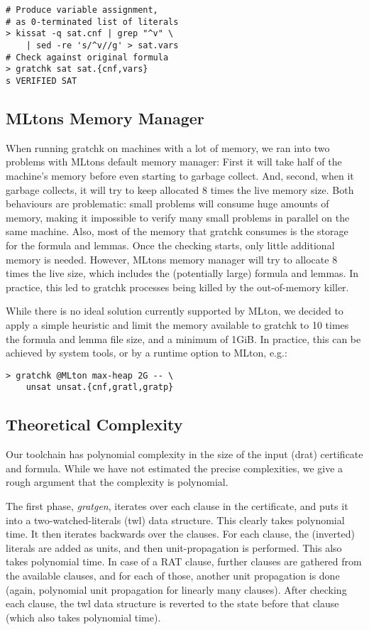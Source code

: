 \documentclass[conference]{IEEEtran}
\begin{document}
{\footnotesize
\begin{verbatim}
# Produce variable assignment,
# as 0-terminated list of literals
> kissat -q sat.cnf | grep "^v" \
    | sed -re 's/^v//g' > sat.vars
# Check against original formula
> gratchk sat sat.{cnf,vars}
s VERIFIED SAT
\end{verbatim}
}

\subsection{MLtons Memory Manager}
When running gratchk on machines with a lot of memory, we ran into two problems with MLtons default memory manager:
First it will take half of the machine's memory before even starting to garbage collect. And, second, when it garbage collects, it will try to keep allocated 8 times the live memory size. Both behaviours are problematic: small problems will consume huge amounts of memory, making it impossible to verify many small problems in parallel on the same machine. Also, most of the memory that gratchk consumes is the storage for the formula and lemmas. Once the checking starts, only little additional memory is needed. However, MLtons memory manager will try to allocate 8 times the live size, which includes the (potentially large) formula and lemmas. In practice, this led to gratchk processes being killed by the out-of-memory killer.

While there is no ideal solution currently supported by MLton, we decided to apply a simple heuristic and limit the memory available to gratchk to 10 times the formula and lemma file size, and a minimum of 1GiB. In practice, this can be achieved by system tools, or by a runtime option to MLton, e.g.:

{\footnotesize
\begin{verbatim}
> gratchk @MLton max-heap 2G -- \
    unsat unsat.{cnf,gratl,gratp}
\end{verbatim}
}


\subsection{Theoretical Complexity}
Our toolchain has polynomial complexity in the size of the input (drat) certificate and formula.
While we have not estimated the precise complexities, we give a rough argument that the complexity is polynomial.

The first phase, {\sl gratgen}, iterates over each clause in the certificate, and puts it into a two-watched-literals (twl) data structure. This clearly takes polynomial time. It then iterates backwards over the clauses.
For each clause, the (inverted) literals are added as units, and then unit-propagation is performed.
This also takes polynomial time. In case of a RAT clause, further clauses are gathered from the available clauses,
and for each of those, another unit propagation is done (again, polynomial unit propagation for linearly many clauses).
After checking each clause, the twl data structure is reverted to the state before that clause (which also takes polynomial time).
\end{document}
